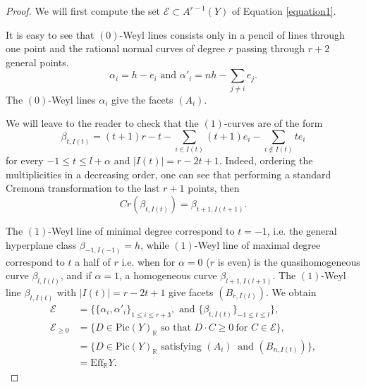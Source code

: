\documentclass[10pt,a4paper]{amsart}
\def\bbR{\mathbb{R}}
\begin{document}
\begin{proof}
We will first compute the set $\mathcal{E} \subset A^{r-1}(Y)$ of Equation \eqref{equation1}.

It is easy to see that $(0)$-Weyl lines consists only in a pencil of lines through one point and the rational normal curves of degree $r$ passing through $r+2$ general points.
\[
\alpha_{i}=h-e_i \text{  and  } \alpha'_{i}=nh - \sum_{j\neq i} e_j.
\]
The $(0)$-Weyl lines $\alpha_{i}$ give the facets $(A_{i})$.

We will leave to the reader to check that the $(1)$-curves are of the form
\[
\beta_{t, I(t)} = (t+1)r-t - \sum_{i\in I(t)} (t+1)e_i -  \sum_{i\notin I(t)} t e_i
\]
for every $-1\leq t\leq l+\alpha$ and $|I(t)|=r-2t+1$.
Indeed, ordering the multiplicities in a decreasing order,
one can see that performing a standard Cremona transformation to the last $r+1$ points, then
\[
Cr(\beta_{t, I(t)}) = \beta_{t+1, I(t+1)}.
\]

The $(1)$-Weyl line of minimal degree correspond to $t=-1$,
i.e. the general hyperplane class $\beta_{-1, I(-1)}=h$,
while $(1)$-Weyl line of maximal degree correspond to $t$ a half of $r$
i.e. when
for $\alpha=0$ ($r$ is even) is the quasihomogeneous curve $\beta_{l, I(l)}$,
and if $\alpha=1$, a homogeneous curve $\beta_{l+1, I(l+1)}$.
The $(1)$-Weyl line $\beta_{t, I(t)}$ with $|I(t)|=r-2t+1$ give facets $(B_{r,I(t)})$.
We obtain
\begin{equation}
\begin{split}
 \mathcal{E}&=\{ \{\alpha_i, \alpha'_i\}_{1\leq i\leq r+3}, \text{ and } \{\beta_{t, I(t)}\}_{ -1 \leq t \leq l} \},\\
\mathcal{E}_{\geq 0}&=\{D\in \text{Pic}(Y)_{\bbR} \text{ so that } D \cdot C\geq 0\ \text{for } C\in \mathcal{E}\},\\
&=\{D\in \text{Pic}(Y)_{\bbR} \text{ satisfying } (A_{i})\ \text{ and } (B_{n,I(t)})\},\\
&= \text{Eff}_{\mathbb{R}} Y.
\end{split}
\end{equation}
\end{proof}
\end{document}
